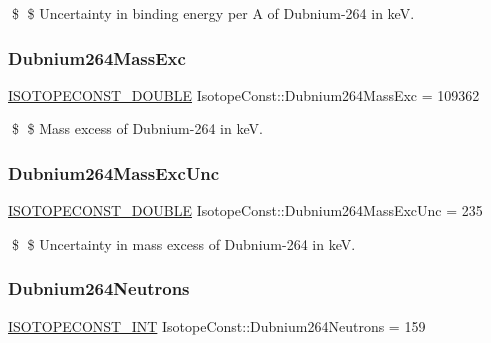 \$ \$ Uncertainty in binding energy per A of Dubnium-\/264 in keV. \mbox{\label{group___isotope_const-_dubnium-_db264_gac39e7156dec2d7c326c2305d486f552c}} 
\subsubsection{\texorpdfstring{Dubnium264\+Mass\+Exc}{Dubnium264MassExc}}
{\footnotesize\ttfamily \mbox{\hyperlink{group___isotope_const-_macros_ga8f45a7272ce02c0b4c65c44636ed719a}{I\+S\+O\+T\+O\+P\+E\+C\+O\+N\+S\+T\+\_\+\+D\+O\+U\+B\+LE}} Isotope\+Const\+::\+Dubnium264\+Mass\+Exc = 109362}

\$ \$ Mass excess of Dubnium-\/264 in keV. \mbox{\label{group___isotope_const-_dubnium-_db264_ga94b65a192efa8ca15931fd675b00cb41}} 
\subsubsection{\texorpdfstring{Dubnium264\+Mass\+Exc\+Unc}{Dubnium264MassExcUnc}}
{\footnotesize\ttfamily \mbox{\hyperlink{group___isotope_const-_macros_ga8f45a7272ce02c0b4c65c44636ed719a}{I\+S\+O\+T\+O\+P\+E\+C\+O\+N\+S\+T\+\_\+\+D\+O\+U\+B\+LE}} Isotope\+Const\+::\+Dubnium264\+Mass\+Exc\+Unc = 235}

\$ \$ Uncertainty in mass excess of Dubnium-\/264 in keV. \mbox{\label{group___isotope_const-_dubnium-_db264_gad3eb0f74179f0c3f7d423537d6257e83}} 
\subsubsection{\texorpdfstring{Dubnium264\+Neutrons}{Dubnium264Neutrons}}
{\footnotesize\ttfamily \mbox{\hyperlink{group___isotope_const-_macros_ga5f18360b3e99483a35c32d789e62621c}{I\+S\+O\+T\+O\+P\+E\+C\+O\+N\+S\+T\+\_\+\+I\+NT}} Isotope\+Const\+::\+Dubnium264\+Neutrons = 159}

